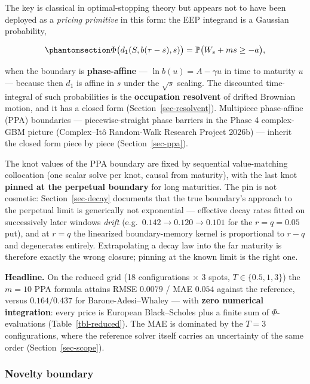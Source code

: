 \documentclass[
  english,
  10pt,
  letterpaper,
  DIV=11,
  numbers=noendperiod]{scrartcl}
\begin{document}
The key is classical in optimal-stopping theory but appears not to have
been deployed as a \emph{pricing primitive} in this form: the EEP
integrand is a Gaussian probability,

\begin{equation}\protect\phantomsection\label{eq-prob}{
\Phi\big(d_1(S,b(\tau-s),s)\big)
=
\mathbb P\big(W_s+m s\ge -a\big),
}\end{equation}

when the boundary is \textbf{phase-affine} --- \(\ln b(u)=A-\gamma u\)
in time to maturity \(u\) --- because then \(d_1\) is affine in \(s\)
under the \(\sqrt s\) scaling. The discounted time-integral of such
probabilities is the \textbf{occupation resolvent} of drifted Brownian
motion, and it has a closed form (Section~\ref{sec-resolvent}).
Multipiece phase-affine (PPA) boundaries --- piecewise-straight phase
barriers in the Phase 4 complex-GBM picture (Complex--Itô Random-Walk
Research Project 2026b) --- inherit the closed form piece by piece
(Section~\ref{sec-ppa}).

The knot values of the PPA boundary are fixed by sequential
value-matching collocation (one scalar solve per knot, causal from
maturity), with the last knot \textbf{pinned at the perpetual boundary}
for long maturities. The pin is not cosmetic: Section~\ref{sec-decay}
documents that the true boundary's approach to the perpetual limit is
generically not exponential --- effective decay rates fitted on
successively later windows \emph{drift} (e.g.~\(0.142\to0.120\to0.101\)
for the \(r=q=0.05\) put), and at \(r=q\) the linearized boundary-memory
kernel is proportional to \(r-q\) and degenerates entirely.
Extrapolating a decay law into the far maturity is therefore exactly the
wrong closure; pinning at the known limit is the right one.

\textbf{Headline.} On the reduced grid (18 configurations \(\times\) 3
spots, \(T\in\{0.5,1,3\}\)) the \(m=10\) PPA formula attains RMSE
\(0.0079\) / MAE \(0.054\) against the reference, versus \(0.164/0.437\)
for Barone-Adesi--Whaley --- with \textbf{zero numerical integration}:
every price is European Black--Scholes plus a finite sum of
\(\Phi\)-evaluations (Table~\ref{tbl-reduced}). The MAE is dominated by
the \(T=3\) configurations, where the reference solver itself carries an
uncertainty of the same order (Section~\ref{sec-scope}).

\subsubsection{Novelty boundary}\label{sec-novelty}
\end{document}
